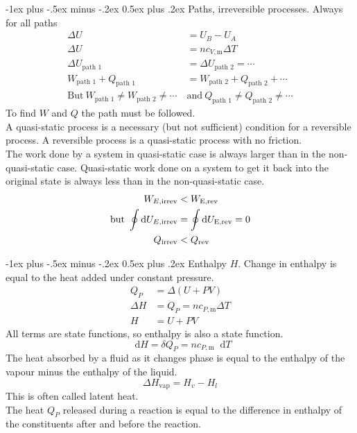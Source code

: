 \documentclass[10pt,landscape,a4paper]{article}
\makeatletter
\renewcommand\d{\mathop{}\!\mathrm{d}}
\renewcommand{\section}{\@startsection{section}{1}{0mm}%
	{-1ex plus -.5ex minus -.2ex}%
	{0.5ex plus .2ex}%
	{\normalfont\large\bfseries}}
\makeatother
\begin{document}
\begin{multicols}{3}
	\section{Paths, irreversible processes.}
	Always for all paths
	\begin{align*}
		\Delta U                                                        & =U_B-U_A                                                     \\
		\Delta U                                                        & =nc_{V,\text{m}}\Delta T                                     \\
		\Delta U_\text{path 1}                                          & =\Delta U_\text{path 2}=\cdots                               \\
		W_\text{path 1}+Q_\text{path 1}                                 & =W_\text{path 2}+Q_\text{path 2}+\cdots                      \\
		\text{But} \ W_\text{path 1} \neq W_\text{path 2} \neq\cdots \  & \text{and} \ Q_\text{path 1} \neq Q_\text{path 2} \neq\cdots
	\end{align*}
	To find $ W $ and $ Q $ the path must be followed.\\
	A quasi-static process is a necessary (but not sufficient) condition for a reversible process.
	A reversible process is a quasi-static process with no friction.\\
	The work done by a system in quasi-static case is always larger than in the non-quasi-static case.
	Quasi-static work done on a system to get it back into the original state is always less than in the non-quasi-static case.
	\begin{align*}
		W_{E,\text{irrev}}                        & <W_\text{E,\text{rev}}             \\
		\text{but} \ \oint{\d U_{E,\text{irrev}}} & =\oint{\d U_\text{E,\text{rev}}}=0 \\
		Q_\text{irrev}                            & <Q_\text{rev}
	\end{align*}
	
	\section{Enthalpy $ H $.}
	Change in enthalpy is equal to the heat added under constant pressure.
	\begin{align*}
		Q_P      & =\Delta(U+PV)                \\
		\Delta H & =Q_P=nc_{P,\text{m}}\Delta T \\
		H        & =U+PV
	\end{align*}
	All terms are state functions, so enthalpy is also a state function.
	\[
		\d H=\delta Q_P=nc_{P,\text{m}}\d T
	\]
	The heat absorbed by a fluid as it changes phase is equal to the enthalpy of the vapour minus the enthalpy of the liquid.
	\[
		\Delta H_\text{vap}=H_v-H_l
	\]
	This is often called latent heat.\\
	The heat $ Q_P $ released during a reaction is equal to the difference in enthalpy of the constituents after and before the reaction.
	

\end{multicols}
\end{document}
